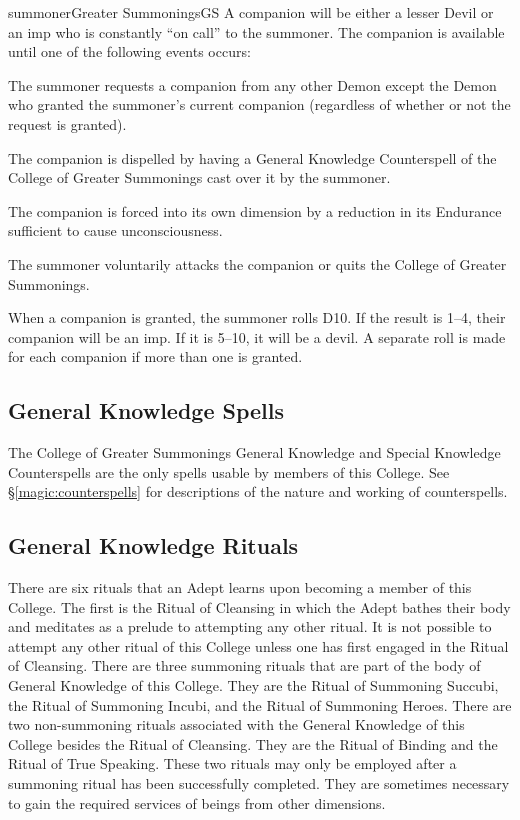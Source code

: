 \begin{college}[1.0]{summoner}{Greater Summonings}{GS}
A companion will be either a lesser Devil or an imp who is constantly
``on call'' to the summoner.  The companion is available until one of
the following events occurs:

\begin{Enumerate}
\item
The summoner requests a companion from any other Demon except the
Demon who granted the summoner's current companion (regardless of
whether or not the request is granted).

\item
The companion is dispelled by having a General Knowledge Counterspell
of the College of Greater Summonings cast over it by the summoner.

\item
The companion is forced into its own dimension by a reduction in its
Endurance sufficient to cause unconsciousness.

\item
The summoner voluntarily attacks the companion or quits the College of
Greater Summonings.
\end{Enumerate}

When a companion is granted, the summoner rolls D10.  If the result is
1--4, their companion will be an imp.  If it is 5--10, it will be a
devil.  A separate roll is made for each companion if more than one is
granted.

\subsection{General Knowledge Spells}

The College of Greater Summonings General Knowledge and Special
Knowledge Counterspells are the only spells usable by members of this
College.  See \S\ref{magic:counterspells} for descriptions of the
nature and working of counterspells.

\subsection{General Knowledge Rituals}

There are six rituals that an Adept learns upon becoming a member of
this College.  The first is the Ritual of Cleansing in which the Adept
bathes their body and meditates as a prelude to attempting any other
ritual.  It is not possible to attempt any other ritual of this
College unless one has first engaged in the Ritual of Cleansing.
There are three summoning rituals that are part of the body of General
Knowledge of this College.  They are the Ritual of Summoning Succubi,
the Ritual of Summoning Incubi, and the Ritual of Summoning Heroes.
There are two non-summoning rituals associated with the General
Knowledge of this College besides the Ritual of Cleansing.  They are
the Ritual of Binding and the Ritual of True Speaking.  These two
rituals may only be employed after a summoning ritual has been
successfully completed.  They are sometimes necessary to gain the
required services of beings from other dimensions.


\end{college}
